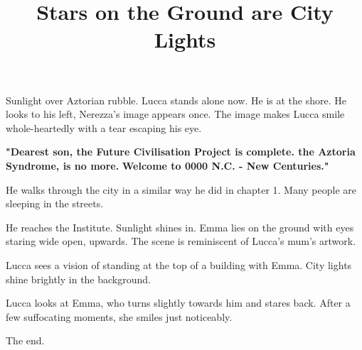 \documentclass[11pt]{article}
\begin{document}
\ttfamily
\title{Stars on the Ground are City Lights}
\maketitle

Sunlight over Aztorian rubble.
Lucca stands alone now. 
He is at the shore.
He looks to his left, Nerezza's image appears once.
The image makes Lucca smile whole-heartedly with a tear escaping his eye.

\textbf{"Dearest son, the Future Civilisation Project is complete. 
the Aztoria Syndrome, is no more.}
\textbf{Welcome to 0000 N.C. - New Centuries."}

He walks through the city in a similar way he did in chapter 1.
Many people are sleeping in the streets. 

He reaches the Institute.
Sunlight shines in. 
Emma lies on the ground with eyes staring wide open, upwards.
The scene is reminiscent of Lucca's mum's artwork.

Lucca sees a vision of standing at the top of a building with Emma.
City lights shine brightly in the background.

Lucca looks at Emma, who turns slightly towards him and stares back.
After a few suffocating moments, she smiles just noticeably.

The end.
\end{document}
